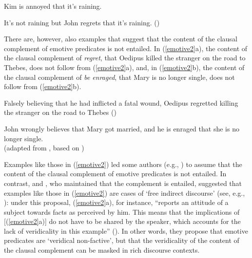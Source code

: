 \documentclass[11pt,fleqn]{article}
\def\infelic{{\leavevmode\llap{\#}}}
\newcommand{\6}{\mbox{$[\hspace*{-.6mm}[$}}
\newcommand{\9}{\mbox{$]\hspace*{-.6mm}]$}}
\begin{document}
\begin{exe}

\ex\label{emotive1}

\begin{xlist}

\ex Kim is annoyed that it's raining.

\ex \infelic It's not raining but John regrets that it's raining. \hfill (\citealt[514]{abrusan2011})

\end{xlist}

\end{exe}

There are, however, also examples that suggest that the content of the clausal complement of emotive predicates is not entailed. In (\ref{emotive2}a), the content of the clausal complement of {\em regret}, that Oedipus killed the stranger on the road to Thebes, does not follow from (\ref{emotive2}a), and, in (\ref{emotive2}b), the content of the clausal complement of {\em be enraged}, that Mary is no longer single, does not follow from (\ref{emotive2}b). 

\begin{exe}

\ex\label{emotive2}

\begin{xlist}

\ex Falsely believing that he had inflicted a fatal wound, Oedipus regretted killing the stranger on the road to Thebes \hfill (\citealt{klein1975})

\ex John wrongly believes that Mary got married, and he is enraged that she is no longer single. \\ \hspace*{.2cm} \hfill (adapted from \citealt{egre2008}, based on \citealt{schlenker03})

\end{xlist}

\end{exe}
Examples like those in (\ref{emotive2}) led some authors (e.g., \citealt{klein1975,giannakidou1998,schlenker2003,egre2008}) to assume that the content of the clausal complement of emotive predicates is not entailed. In contrast, \citet{gazdar79a} and \citet{abrusan2011}, who maintained that the complement is entailed, suggested that examples like those in (\ref{emotive2}) are cases of `free indirect discourse' (see, e.g., \citealt{eckardt2014}):  under this proposal, (\ref{emotive2}a), for instance, ``reports an attitude of a subject towards facts as perceived by him. This means that the implications of [(\ref{emotive2}a)] do not have to be shared by the speaker, which accounts for the lack of veridicality in this example'' (\citealt[514]{abrusan2011}). In other words, they propose that emotive predicates are `veridical non-factive', but that the veridicality of the content of the clausal complement can be masked in rich discourse contexts.
\end{document}
